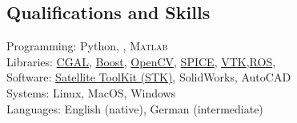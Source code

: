 \subsection*{Qualifications and Skills}
{}

Programming: Python, \CC, \textsc{Matlab} \\
Libraries: \href{https://www.cgal.org/}{CGAL}, \href{https://www.boost.org/}{Boost}, \href{https:://opencv.org/}{OpenCV}, \href{https://naif.jpl.nasa.gov/naif/toolkit.html}{SPICE}, \href{https://www.vtk.org}{VTK},\href{http://www.ros.org}{ROS}, \\
Software: \href{http://www.agi.com/products/engineering-tools}{Satellite ToolKit (STK)},   SolidWorks, AutoCAD \\
Systems: Linux, MacOS, Windows \\
Languages: English (native), German (intermediate)
